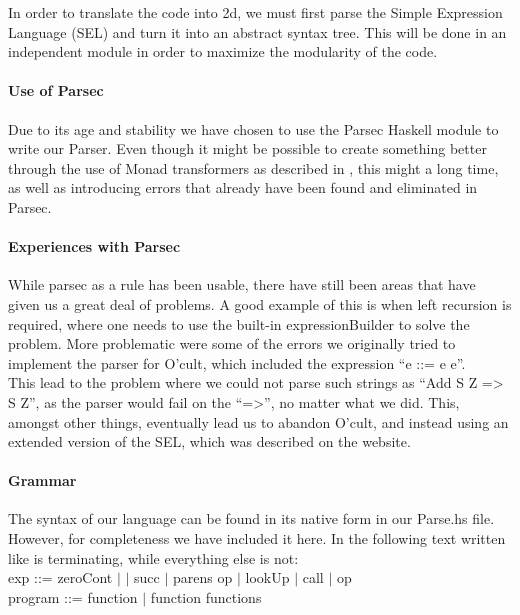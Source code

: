 In order to translate the code into 2d, we must first parse the Simple
Expression Language (SEL) and turn it into an abstract syntax
tree. This will be done in an independent module in order to maximize
the modularity of the code.

\paragraph{Use of Parsec}
Due to its age and stability we have chosen to use the Parsec Haskell
module to write our Parser. Even though it might be possible to create
something better through the use of Monad transformers as described in
\cite{partial+parsing}, this might a long time, as well as introducing
errors that already have been found and eliminated in Parsec.

\paragraph{Experiences with Parsec}
While parsec as a rule has been usable, there have still been areas that have given us a great deal of problems. A
good example of this is when left recursion is required, where one
needs to use the built-in expressionBuilder to solve the problem. More
problematic were some of the errors we originally tried to implement
the parser for O'cult, which included the expression ``e ::= e e''.\\

This lead to the problem where we could not parse such strings as
``Add S Z => S Z'', as the parser would fail on the ``=>'', no matter
what we did. This, amongst other things, eventually lead us to abandon
O'cult, and instead using an extended version of the SEL, which was described on the website.

\paragraph{Grammar}
The syntax of our language can be found in its native form in our
Parse.hs file. However, for completeness we have included it here. In
the following text written like  is terminating, while
everything else is not:\\

exp ::= zeroCont $\mid$  $\mid$ succ $\mid$ parens op $\mid$ lookUp $\mid$ call $\mid$ op\\

program ::= function $\mid$ function functions\\


